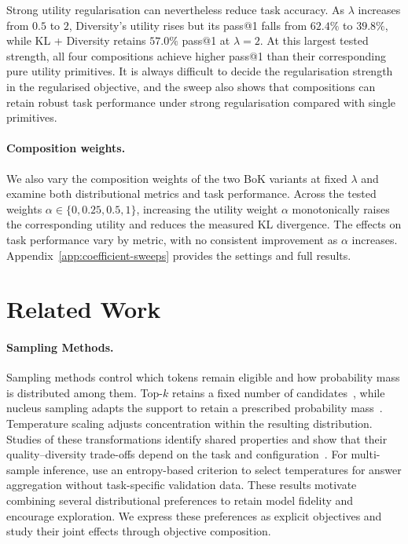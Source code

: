 \documentclass{article} %
\begin{document}
Strong utility regularisation can nevertheless reduce task accuracy. As $\lambda$ increases from $0.5$ to $2$, Diversity's utility rises but its pass@1 falls from $62.4\%$ to $39.8\%$, while KL + Diversity retains $57.0\%$ pass@1 at $\lambda=2$. At this largest tested strength, all four compositions achieve higher pass@1 than their corresponding pure utility primitives. It is always difficult to decide the regularisation strength in the regularised objective, and the sweep also shows that compositions can retain robust task performance under strong regularisation compared with single primitives.

\paragraph{Composition weights.} We also vary the composition weights of the two BoK variants at fixed $\lambda$ and examine both distributional metrics and task performance. Across the tested weights $\alpha \in \{0, 0.25, 0.5, 1\}$, increasing the utility weight $\alpha$ monotonically raises the corresponding utility and reduces the measured KL divergence. The effects on task performance vary by metric, with no consistent improvement as $\alpha$ increases. Appendix~\ref{app:coefficient-sweeps} provides the settings and full results.


\section{Related Work}
\label{sec:related_work}

\paragraph{Sampling Methods.} Sampling methods control which tokens remain eligible and how probability mass is distributed among them.
Top-$k$ retains a fixed number of candidates~\citep{fan2018hierarchicalneuralstorygeneration}, while nucleus sampling adapts the support to retain a prescribed probability mass~\citep{holtzman2019curious}.
Temperature scaling adjusts concentration within the resulting distribution.
Studies of these transformations identify shared properties and show that their quality--diversity trade-offs depend on the task and configuration~\citep{nadeem2020systematic,wiher2022decoding}.
For multi-sample inference, \citet{du2025temperature} use an entropy-based criterion to select temperatures for answer aggregation without task-specific validation data.
These results motivate combining several distributional preferences to retain model fidelity and encourage exploration.
We express these preferences as explicit objectives and study their joint effects through objective composition.
\end{document}
